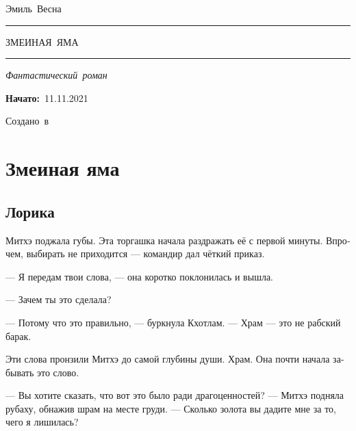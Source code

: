 \documentclass[a4paper,12pt,fleqn]{book}\usepackage{polyglossia}\setdefaultlanguage[babelshorthands=true]{russian}\setotherlanguage{english}\defaultfontfeatures{Ligatures=TeX,Mapping=tex-text}\usepackage{xcolor}\newcommand{\ml}[3]{#2}
\newcommand{\tofaauthor}{\ml{$0$}{Эмиль~Весна}{Emil~Viesn\'{a}}}
\newcommand{\tofatitle}{\ml{$0$}{ЗМЕИНАЯ~ЯМА}{Snake~Pit}}
\newcommand{\tofastarted}{11.11.2021}
\newcommand{\asterism}{\vspace{1em}{\centering\Large\bfseries$\ast~\ast~\ast$\par}\vspace{1em}}
\begin{document}

\begin{titlepage}
{\centering{~\par}\vspace{0.25\textheight}
{\LARGE\tofaauthor}\par
\vspace{1.0cm}\rule{17em}{1pt}\par\vspace{0.3cm}
{\Huge\textsc{\tofatitle}\par}
\vspace{0.3cm}\rule{17em}{2pt}\par\vspace{1.0cm}
{\Large\textit{\ml{$0$}{Фантастический~роман}{Science~fiction}}\par}
\vspace{0.5cm}\asterism\par\vspace{1.0cm}
{\textbf{\ml{$0$}{Начато:}{Started:}}~\tofastarted\par}\vfill
{\Large\ml{$0$}{Создано~в}{Created~by}~\XeLaTeX}\par}
\end{titlepage}

\tableofcontents

\part{Змеиная яма}

\chapter{Лорика}

Митхэ поджала губы.
Эта торгашка начала раздражать её с первой минуты.
Впрочем, выбирать не приходится --- командир дал чёткий приказ.

--- Я передам твои слова, --- она коротко поклонилась и вышла.

\asterism

--- Зачем ты это сделала?

--- Потому что это правильно, --- буркнула Кхотлам.
--- Храм --- это не рабский барак.

Эти слова пронзили Митхэ до самой глубины души.
Храм.
Она почти начала забывать это слово.

\asterism

--- Вы хотите сказать, что вот это было ради драгоценностей? --- Митхэ подняла рубаху, обнажив шрам на месте груди.
--- Сколько золота вы дадите мне за то, чего я лишилась?
\end{document}

